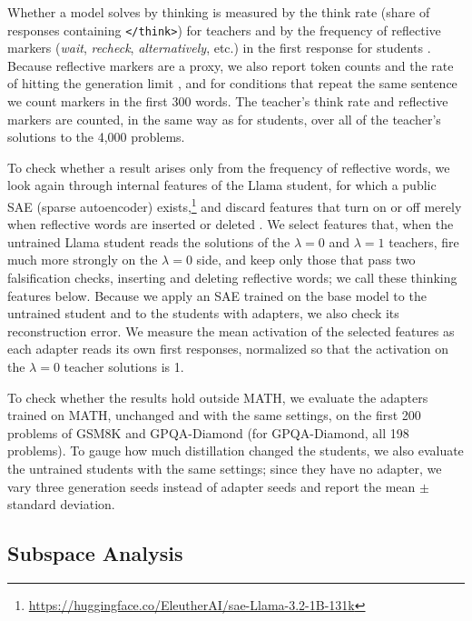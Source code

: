 Whether a model solves by thinking is measured by the think rate (share of responses containing \texttt{</think>}) for teachers \citep{wu2026interpolation} and by the frequency of reflective markers (\emph{wait}, \emph{recheck}, \emph{alternatively}, etc.) in the first response for students \citep{yeo2025demystifying,muennighoff2025s1}.
Because reflective markers are a proxy, we also report token counts and the rate of hitting the generation limit \citep{chen2026molecular,goyal2026cap}, and for conditions that repeat the same sentence we count markers in the first 300 words.
The teacher's think rate and reflective markers are counted, in the same way as for students, over all of the teacher's solutions to the 4,000 problems.

To check whether a result arises only from the frequency of reflective words, we look again through internal features of the Llama student, for which a public SAE (sparse autoencoder) exists,\footnote{\url{https://huggingface.co/EleutherAI/sae-Llama-3.2-1B-131k}} and discard features that turn on or off merely when reflective words are inserted or deleted \citep{ma2026sae}.
We select features that, when the untrained Llama student reads the solutions of the $\lambda=0$ and $\lambda=1$ teachers, fire much more strongly on the $\lambda=0$ side, and keep only those that pass two falsification checks, inserting and deleting reflective words; we call these thinking features below.
Because we apply an SAE trained on the base model to the untrained student and to the students with adapters, we also check its reconstruction error.
We measure the mean activation of the selected features as each adapter reads its own first responses, normalized so that the activation on the $\lambda=0$ teacher solutions is 1.

To check whether the results hold outside MATH, we evaluate the adapters trained on MATH, unchanged and with the same settings, on the first 200 problems of GSM8K \citep{cobbe2021training} and GPQA-Diamond \citep{rein2023gpqa} (for GPQA-Diamond, all 198 problems).
To gauge how much distillation changed the students, we also evaluate the untrained students with the same settings; since they have no adapter, we vary three generation seeds instead of adapter seeds and report the mean $\pm$ standard deviation.

\subsection{Subspace Analysis}
\label{sec:subspace}

